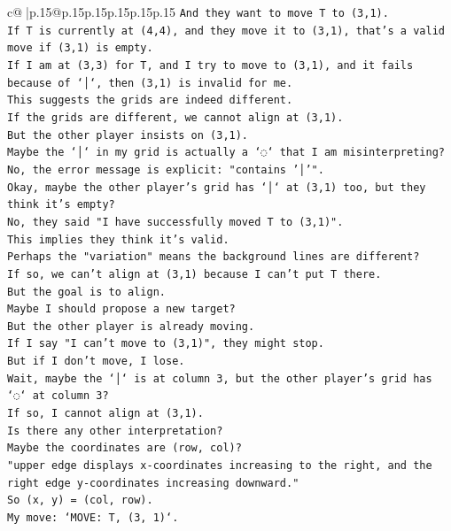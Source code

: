 \documentclass{article}
\begin{document}
{\begin{supertabular}{c@{$\;$}|p{.15\linewidth}@{}p{.15\linewidth}p{.15\linewidth}p{.15\linewidth}p{.15\linewidth}p{.15\linewidth}}
{{{\texttt{And they want to move T to (3,1).} \\
\texttt{If T is currently at (4,4), and they move it to (3,1), that's a valid move if (3,1) is empty.} \\
\texttt{If I am at (3,3) for T, and I try to move to (3,1), and it fails because of `│`, then (3,1) is invalid for me.} \\
\texttt{This suggests the grids are indeed different.} \\
\texttt{If the grids are different, we cannot align at (3,1).} \\
\texttt{But the other player insists on (3,1).} \\
\texttt{Maybe the `│` in my grid is actually a `◌` that I am misinterpreting?} \\
\texttt{No, the error message is explicit: "contains '│'".} \\
\texttt{Okay, maybe the other player's grid has `│` at (3,1) too, but they think it's empty?} \\
\texttt{No, they said "I have successfully moved T to (3,1)".} \\
\texttt{This implies they think it's valid.} \\
\texttt{Perhaps the "variation" means the background lines are different?} \\
\texttt{If so, we can't align at (3,1) because I can't put T there.} \\
\texttt{But the goal is to align.} \\
\texttt{Maybe I should propose a new target?} \\
\texttt{But the other player is already moving.} \\
\texttt{If I say "I can't move to (3,1)", they might stop.} \\
\texttt{But if I don't move, I lose.} \\
\texttt{Wait, maybe the `│` is at column 3, but the other player's grid has `◌` at column 3?} \\
\texttt{If so, I cannot align at (3,1).} \\
\texttt{Is there any other interpretation?} \\
\texttt{Maybe the coordinates are (row, col)?} \\
\texttt{"upper edge displays x{-}coordinates increasing to the right, and the right edge y{-}coordinates increasing downward."} \\
\texttt{So (x, y) = (col, row).} \\
\texttt{My move: `MOVE: T, (3, 1)`.} \\
}}}
\end{supertabular}}
\end{document}
